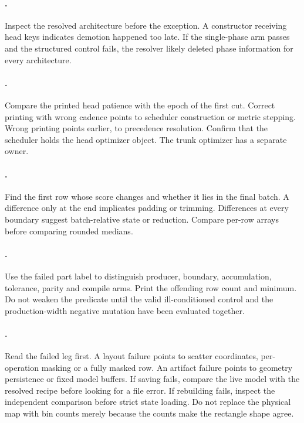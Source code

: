 \paragraph{.}
Inspect the resolved architecture before the exception.  A constructor
receiving head keys indicates demotion happened too late.  If the single-phase
arm passes and the structured control fails, the resolver likely deleted
phase information for every architecture.

\paragraph{.}
Compare the printed head patience with the epoch of the first cut.  Correct
printing with wrong cadence points to scheduler construction or metric
stepping.  Wrong printing points earlier, to precedence resolution.  Confirm
that the scheduler holds the head optimizer object.  The trunk optimizer has
a separate owner.

\paragraph{.}
Find the first row whose score changes and whether it lies in the final batch.
A difference only at the end implicates padding or trimming.  Differences at
every boundary suggest batch-relative state or reduction.  Compare per-row
arrays before comparing rounded medians.

\paragraph{.}
Use the failed part label to distinguish producer, boundary, accumulation,
tolerance, parity and compile arms.  Print the offending row count and
minimum.  Do not weaken the predicate until the valid ill-conditioned control
and the production-width negative mutation have been evaluated together.

\paragraph{.}
Read the failed leg first.  A layout failure points to scatter coordinates,
per-operation masking or a fully masked row.  An artifact failure points to
geometry persistence or fixed model buffers.  If saving fails, compare the live
model with the resolved recipe before looking for a file error.  If rebuilding
fails, inspect the independent comparison before strict state loading.  Do not
replace the physical map with bin counts merely because the counts make the
rectangle shape agree.

